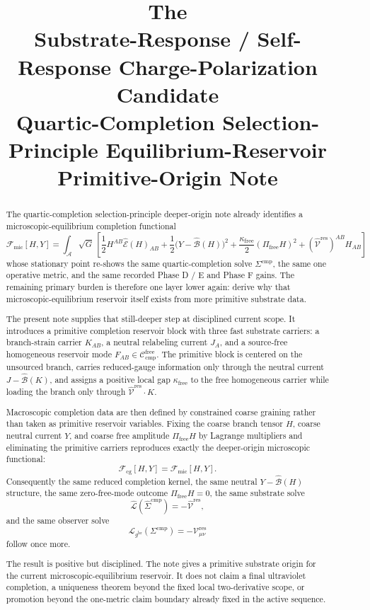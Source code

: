 \documentclass[11pt]{article}
\title{\textbf{The \TheoryName{}}\\[0.4em]
\large Substrate-Response / Self-Response Charge-Polarization Candidate\\
\large Quartic-Completion Selection-Principle Equilibrium-Reservoir Primitive-Origin Note}
\author{}
\date{}
\newcommand{\Sub}{\mathcal A}
\newcommand{\ObserverMetric}{g^{\mathrm{br}}}
\newcommand{\CompShift}{\Sigma^{\mathrm{cmp}}}
\newcommand{\CompLift}{\widehat\Sigma^{\mathrm{cmp}}}
\newcommand{\ResidualCore}{\mathcal V_{\mu\nu}^{\mathrm{res}}}
\newcommand{\ResidualLift}{\widehat{\mathcal V}^{\mathrm{res}}}
\newcommand{\SubEinLin}{\widehat{\mathcal E}}
\newcommand{\SubGaugeVec}{\widehat{\mathcal B}}
\newcommand{\SubReducedEin}{\widehat{\mathcal L}}
\newcommand{\FreeProj}{\Pi_{\mathrm{free}}}
\newcommand{\GaugeAux}{Y}
\newcommand{\ReducedEin}{\mathcal L_{\ObserverMetric}}
\newcommand{\CompFree}{\mathscr C_{\mathrm{cmp}}^{\mathrm{free}}}
\newcommand{\MicFunctional}{\mathscr F_{\mathrm{mic}}}
\newcommand{\CoarseFunctional}{\mathscr F_{\mathrm{cg}}}
\newcommand{\FreeStiff}{\kappa_{\mathrm{free}}}
\newcommand{\PrimStrain}{K}
\newcommand{\PrimNeutral}{J}
\newcommand{\PrimFree}{F}
\begin{document}
\maketitle

\begin{abstract}
The quartic-completion selection-principle deeper-origin note already identifies a microscopic-equilibrium completion functional
\[
\MicFunctional[H,\GaugeAux]
=
\int_{\Sub}\sqrt{G}\,
\left[
\frac12 H^{AB}\SubEinLin(H)_{AB}
 +\frac12\bigl(\GaugeAux-\SubGaugeVec(H)\bigr)^2
 +\frac{\FreeStiff}{2}(\FreeProj H)^2
+(\ResidualLift)^{AB}H_{AB}
\right]
\]
whose stationary point re-shows the same quartic-completion solve \(\Sigma^{\mathrm{cmp}}\), the same one operative metric, and the same recorded Phase D / E and Phase F gains. The remaining primary burden is therefore one layer lower again: derive why that microscopic-equilibrium reservoir itself exists from more primitive substrate data.

The present note supplies that still-deeper step at disciplined current scope. It introduces a primitive completion reservoir block with three fast substrate carriers: a branch-strain carrier \(\PrimStrain_{AB}\), a neutral relabeling current \(\PrimNeutral_A\), and a source-free homogeneous reservoir mode \(\PrimFree_{AB}\in\CompFree\). The primitive block is centered on the unsourced branch, carries reduced-gauge information only through the neutral current \(\PrimNeutral-\SubGaugeVec(\PrimStrain)\), and assigns a positive local gap \(\FreeStiff\) to the free homogeneous carrier while loading the branch only through \(\ResidualLift\cdot\PrimStrain\).

Macroscopic completion data are then defined by constrained coarse graining rather than taken as primitive reservoir variables. Fixing the coarse branch tensor \(H\), coarse neutral current \(\GaugeAux\), and coarse free amplitude \(\FreeProj H\) by Lagrange multipliers and eliminating the primitive carriers reproduces exactly the deeper-origin microscopic functional:
\[
\CoarseFunctional[H,\GaugeAux]=\MicFunctional[H,\GaugeAux].
\]
Consequently the same reduced completion kernel, the same neutral \( \GaugeAux-\SubGaugeVec(H)\) structure, the same zero-free-mode outcome \(\FreeProj H=0\), the same substrate solve
\[
\SubReducedEin(\CompLift)=-\ResidualLift,
\]
and the same observer solve
\[
\ReducedEin(\CompShift)=-\ResidualCore
\]
follow once more.

The result is positive but disciplined. The note gives a primitive substrate origin for the current microscopic-equilibrium reservoir. It does not claim a final ultraviolet completion, a uniqueness theorem beyond the fixed local two-derivative scope, or promotion beyond the one-metric claim boundary already fixed in the active sequence.
\end{abstract}
\end{document}
